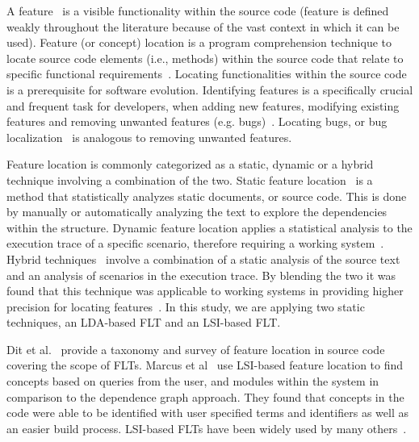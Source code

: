 A feature~\cite{Biggerstaff-etal:1993} is a visible functionality within the source code
(feature is defined weakly throughout the literature because of the vast
context in which it can be used). Feature (or concept) location is a program
comprehension technique to locate source code elements (i.e., methods)
within the source code that relate to specific functional
requirements~\cite{Eisenbarth-etal:2001, Biggers-etal:2014}. Locating functionalities
within the source code is a prerequisite for software evolution.  Identifying features is a specifically crucial and frequent task for
developers, when adding new features, modifying existing features and removing
unwanted features (e.g.  bugs)~\cite{Rajlich-Gosavi:2004, Dit-etal:2013b}. Locating bugs,
or bug localization~\cite{Lukins-etal:2008, Bassett-Kraft:2013} is analogous to removing unwanted features.

Feature location is commonly categorized as a static, dynamic or a hybrid
technique involving a combination of the two. Static feature
location~\cite{Zhao-etal:2006} is a method that statistically analyzes
static documents, or source code. This is done by manually or automatically
analyzing the text to explore the dependencies within the structure. Dynamic
feature location applies a statistical analysis to the execution trace of a
specific scenario, therefore requiring a working system~\cite{Eisenbarth-etal:2001,Poshyvanyk-etal:2007}.
Hybrid techniques~\cite{Eisenbarth-etal:2003, Eaddy-etal:2008, Revelle-etal:2010} involve a combination of a static analysis of
the source text and an analysis of scenarios in the execution trace. By
blending the two it was found that this technique was applicable to working
systems in providing higher precision for locating features~\cite{Poshyvanyk-etal:2007,
Ernst:2004, Revelle-Coppitt:UNK}. In this study, we are applying two static
techniques, an LDA-based FLT and an LSI-based FLT.

Dit et al.~\cite{Dit-etal:2013b} provide a taxonomy and survey of feature
location in source code covering the scope of FLTs.  Marcus et
al~\cite{Marcus-etal:2004} use LSI-based feature location to find concepts based on
queries from the user, and modules within the system in comparison to the
dependence graph approach. They found that concepts in the code were able to be
identified with user specified terms and identifiers as well as an easier build
process. LSI-based FLTs have been widely used by many others~\cite{
Poshyvanyk-etal:2006, Poshyvanyk-Marcus:2007, Liu-etal:2007, Scanniello-Marcus:2011,
Eaddy-etal:2008, Cubranic-etal:2005}.

